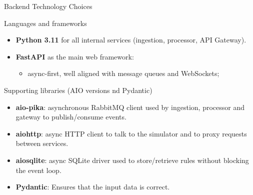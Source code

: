 \documentclass[aspectratio=169]{beamer}
\begin{document}
\begin{frame}[t]{Backend Technology Choices}
  \small
  \begin{block}{Languages and frameworks}
    \begin{itemize}
      \item \textbf{Python 3.11} for all internal services (ingestion, processor, API Gateway).
      \item \textbf{FastAPI} as the main web framework:
        \begin{itemize}
          \item async-first, well aligned with message queues and WebSockets;
        \end{itemize}
    \end{itemize}
  \end{block}
  \vspace{0.1cm}
  \begin{block}{Supporting libraries (AIO versions nd Pydantic)}
    \begin{itemize}
      \item \textbf{aio-pika}: asynchronous RabbitMQ client used by ingestion, processor and gateway to publish/consume events.
      \item \textbf{aiohttp}: async HTTP client to talk to the simulator and to proxy requests between services.
      \item \textbf{aiosqlite}: async SQLite driver used to store/retrieve rules without blocking the event loop.
      \item \textbf{Pydantic}: Ensures that the input data is correct.
    \end{itemize}
  \end{block}
\end{frame}
\end{document}

